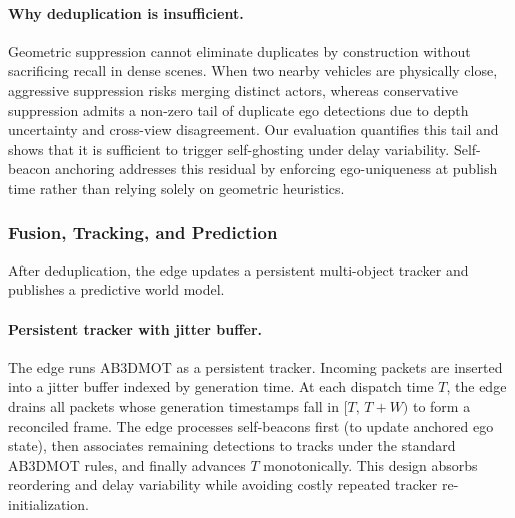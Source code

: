 \paragraph{Why deduplication is insufficient.}
Geometric suppression cannot eliminate duplicates by construction without sacrificing recall in dense scenes. When two nearby vehicles are physically close, aggressive suppression risks merging distinct actors, whereas conservative suppression admits a non-zero tail of duplicate ego detections due to depth uncertainty and cross-view disagreement. Our evaluation quantifies this tail and shows that it is sufficient to trigger self-ghosting under delay variability. Self-beacon anchoring addresses this residual by enforcing ego-uniqueness at publish time rather than relying solely on geometric heuristics.



\subsubsection{Fusion, Tracking, and Prediction}
After deduplication, the edge updates a persistent multi-object tracker and publishes a predictive world model.

\paragraph{Persistent tracker with jitter buffer.}
The edge runs AB3DMOT as a persistent tracker. Incoming packets are inserted into a jitter buffer indexed by generation time. At each dispatch time \(T\), the edge drains all packets whose generation timestamps fall in \([T,\,T{+}W)\) to form a reconciled frame. The edge processes self-beacons first (to update anchored ego state), then associates remaining detections to tracks under the standard AB3DMOT rules, and finally advances \(T\) monotonically. This design absorbs reordering and delay variability while avoiding costly repeated tracker re-initialization.

